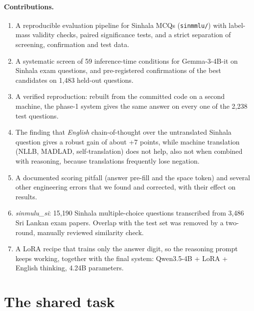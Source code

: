 \documentclass[10pt,a4paper]{article}
\begin{document}
\paragraph{Contributions.}
\begin{enumerate}
\item A reproducible evaluation pipeline for Sinhala MCQs (\texttt{sinmmlu/}) with label-mass validity checks,
paired significance tests, and a strict separation of screening, confirmation and test data.
\item A systematic screen of 59 inference-time conditions for Gemma-3-4B-it on Sinhala exam questions, and
pre-registered confirmations of the best candidates on 1,483 held-out questions.
\item A verified reproduction: rebuilt from the committed code on a second machine, the phase-1 system gives the same
answer on every one of the 2,238 test questions.
\item The finding that \emph{English} chain-of-thought over the untranslated Sinhala question gives a robust gain
of about +7 points, while machine translation (NLLB, MADLAD, self-translation) does not help, also not when combined
with reasoning, because translations frequently lose negation.
\item A documented scoring pitfall (answer pre-fill and the space token) and several other engineering errors
that we found and corrected, with their effect on results.
\item \emph{sinmulu\_si}: 15,190 Sinhala multiple-choice questions transcribed from 3,486 Sri Lankan exam papers.
Overlap with the test set was removed by a two-round, manually reviewed similarity check.
\item A LoRA recipe that trains only the answer digit, so the reasoning prompt keeps working, together with the final
system: Qwen3.5-4B + LoRA + English thinking, 4.24B parameters.
\end{enumerate}

\section{The shared task}\label{sec:task}
\end{document}
